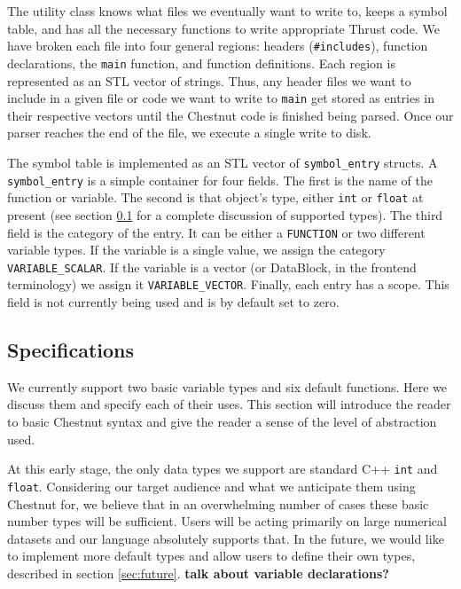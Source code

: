 \documentclass{article}
\renewcommand{\|}{\origbar} %
\newcommand{\code}[1]{\texttt{#1}}
\begin{document}
The utility class knows what files we eventually want to write to, keeps a symbol table, and has all the necessary functions to write appropriate Thrust code. We have broken each file into four general regions: headers (\code{\#includes}), function declarations, the \code{main} function, and function definitions. Each region is represented as an STL vector of strings. Thus, any header files we want to include in a given file or code we want to write to \code{main} get stored as entries in their respective vectors until the Chestnut code is finished being parsed. Once our parser reaches the end of the file, we execute a single write to disk.

The symbol table is implemented as an STL vector of \code{symbol\_entry} structs. A \code{symbol\_entry} is a simple container for four fields. The first is the name of the function or variable. The second is that object's type, either \code{int} or \code{float} at present (see section \ref{sec:specifications} for a complete discussion of supported types). The third field is the category of the entry. It can be either a \code{FUNCTION} or two different variable types. If the variable is a single value, we assign the category \code{VARIABLE\_SCALAR}. If the variable is a vector (or DataBlock, in the frontend terminology) we assign it \code{VARIABLE\_VECTOR}. Finally, each entry has a scope. This field is not currently being used and is by default set to zero. 

\subsection{Specifications}
\label{sec:specifications}

We currently support two basic variable types and six default functions. Here we discuss them and specify each of their uses. This section will introduce the reader to basic Chestnut syntax and give the reader a sense of the level of abstraction used.

At this early stage, the only data types we support are standard C++ \code{int} and \code{float}. Considering our target audience and what we anticipate them using Chestnut for, we believe that in an overwhelming number of cases these basic number types will be sufficient. Users will be acting primarily on large numerical datasets and our language absolutely supports that. In the future, we would like to implement more default types and allow users to define their own types, described in section \ref{sec:future}. {\bf talk about variable declarations?}
\end{document}
